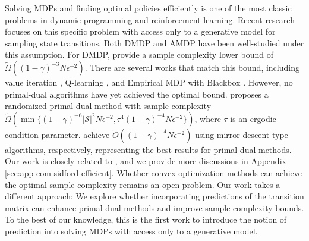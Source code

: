 \documentclass[12pt]{article}
\begin{document}
Solving MDPs and finding optimal policies efficiently is one of the most classic problems in dynamic programming and reinforcement learning. 
Recent research focuses on this specific problem with access only to a generative model for sampling state transitions. Both DMDP and AMDP have been well-studied under this assumption. For DMDP, \cite{gheshlaghi2013minimax} provide a sample complexity lower bound of $\tilde{\Omega}((1-\gamma)^{-3} N \epsilon^{-2})$. There are several works that match this bound, including value iteration \cite{sidford2018near}, Q-learning \cite{wainwright2019variance}, and Empirical MDP with Blackbox \cite{agarwal2020model}.
However, no primal-dual algorithms have yet achieved the optimal bound. \cite{wang2020randomized} proposes a randomized primal-dual method with sample complexity $\tilde{\Omega}(\min\{(1-\gamma)^{-6} |\mathcal{S}|^2N \epsilon^{-2},\tau^{4}(1-\gamma)^{-4} N \epsilon^{-2}\})$, where $\tau$ is an ergodic condition parameter. 
\cite{jin2020efficiently,cheng2020reduction} achieve $\tilde{O}((1-\gamma)^{-4} N \epsilon^{-2})$ using mirror descent type algorithms, respectively, representing the best results for primal-dual methods. Our work is closely related to \cite{jin2020efficiently}, and we provide more discussions in Appendix \ref{sec:app-com-sidford-efficient}.
Whether convex optimization methods can achieve the optimal sample complexity remains an open problem.
Our work takes a different approach: We explore whether incorporating predictions of the transition matrix can enhance primal-dual methods and improve sample complexity bounds. To the best of our knowledge, this is the first work to introduce the notion of prediction into solving MDPs with access only to a generative model.

\end{document}
